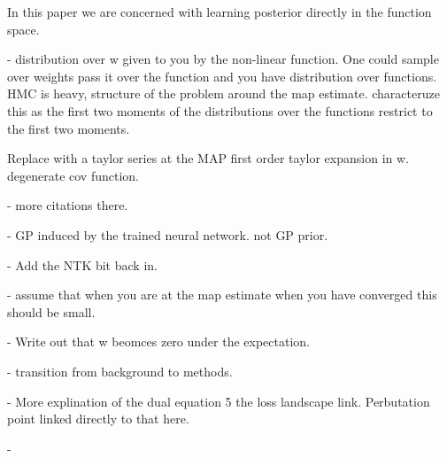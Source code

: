 \documentclass{article}
\newcommand{\weights}{\ensuremath{\mathbf{w}}}
\newcommand{\mbf}[1]{\mathbf{#1}}
\newcommand{\vzeros}{\mbf{0}}
\newcommand{\vx}{\mbf{x}}
\newcommand{\vw}{\mbf{w}}
\newcommand{\Jac}[2]{\mathcal{J}_{#1}(#2)}
\begin{document}
In this paper we are concerned with learning posterior directly in the function space. 


- distribution over w given to you by the non-linear function. One could sample over weights pass it over the function and you have distribution over functions. HMC is heavy, structure of the problem around the map estimate. characteruze this as the first two moments of the distributions over the functions restrict to the first two moments.  

Replace with a taylor series at the MAP first order taylor expansion in w. degenerate cov function.

- more citations there.

- GP induced by the trained neural network. not GP prior.

- Add the NTK bit back in.

- assume that when you are at the map estimate when you have converged this should be small. 

- Write out that w beomces zero under the expectation.

-  transition from background to methods. 

- More explination of the dual equation 5 the loss landscape link. Perbutation point linked directly to that here. 

- 



%
%
%
\end{document}
